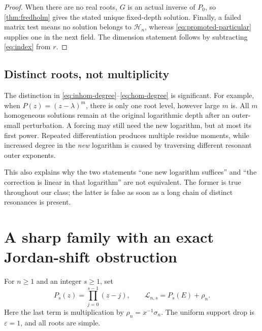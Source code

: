 \documentclass[11pt,a4paper]{article}
\numberwithin{equation}{section}
\theoremstyle{definition}
\theoremstyle{remark}
\newcommand{\HH}{\mathcal H}
\newcommand{\cL}{\mathcal L}
\newcommand{\eps}{\varepsilon}
\begin{document}
\begin{proof}
When there are no real roots, $G$ is an actual inverse of $P_0$, so \cref{thm:fredholm} gives the stated unique fixed-depth solution. Finally, a failed matrix test means no solution belongs to $\HH_n$, whereas \eqref{eq:promoted-particular} supplies one in the next field. The dimension statement follows by subtracting \eqref{eq:index} from $r$.
\end{proof}

\subsection{Distinct roots, not multiplicity}
The distinction in \eqref{eq:inhom-degree}--\eqref{eq:hom-degree} is significant. For example, when $P(z)=(z-\lambda)^m$, there is only one root level, however large $m$ is. All $m$ homogeneous solutions remain at the original logarithmic depth after an outer-small perturbation. A forcing may still need the new logarithm, but at most its first power. Repeated differentiation produces multiple residue moments, while increased degree in the \emph{new} logarithm is caused by traversing different resonant outer exponents.

This also explains why the two statements ``one new logarithm suffices'' and ``the correction is linear in that logarithm'' are not equivalent. The former is true throughout our class; the latter is false as soon as a long chain of distinct resonances is present.

\section{A sharp family with an exact Jordan-shift obstruction}
\label{sec:sharp}
For $n\ge1$ and an integer $s\ge1$, set
\begin{equation}
 P_s(z)=\prod_{j=0}^{s-1}(z-j),\qquad
 \cL_{n,s}=P_s(E)+\rho_n.
 \label{eq:sharp-family}
\end{equation}
Here the last term is multiplication by $\rho_n=x^{-1}\sigma_n$. The uniform support drop is $\eps=1$, and all roots are simple.
\end{document}
